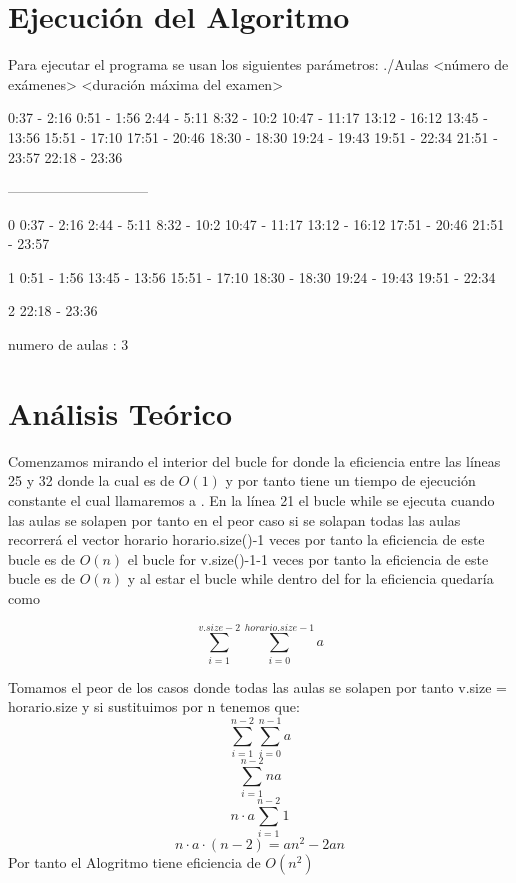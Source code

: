 \documentclass[11pt,openany]{book}
\begin{document}
\section{Ejecución del Algoritmo}
Para ejecutar el programa se usan los siguientes parámetros:
./Aulas <número de exámenes> <duración máxima del examen>

0:37 - 2:16 
0:51 - 1:56 
2:44 - 5:11 
8:32 - 10:2 
10:47 - 11:17 
13:12 - 16:12 
13:45 - 13:56 
15:51 - 17:10 
17:51 - 20:46 
18:30 - 18:30 
19:24 - 19:43 
19:51 - 22:34 
21:51 - 23:57 
22:18 - 23:36 

------------------------------

0
0:37 - 2:16               
2:44 - 5:11 
8:32 - 10:2 
10:47 - 11:17 
13:12 - 16:12 
17:51 - 20:46 
21:51 - 23:57 

1
0:51 - 1:56 
13:45 - 13:56 
15:51 - 17:10 
18:30 - 18:30 
19:24 - 19:43 
19:51 - 22:34 

2 
22:18 - 23:36 

numero de aulas : 3

\section{Análisis Teórico}
Comenzamos mirando el interior del bucle for donde la eficiencia entre 
las líneas 25 y 32 donde la cual es de $O(1)$ y por tanto tiene un tiempo 
de ejecución constante el cual llamaremos a . 
En la línea 21 el bucle while se ejecuta cuando las aulas se solapen 
por tanto en el peor caso si se solapan todas las aulas recorrerá el vector horario 
horario.size()-1 veces por tanto la eficiencia de este bucle es de $O(n)$ 
el bucle for v.size()-1-1 veces por tanto la eficiencia de este bucle es de $O(n)$
y al estar el bucle while dentro del for la eficiencia quedaría como 

\begin{equation*}
      \sum_{i=1}^{v.size -2} \sum_{i=0}^{horario.size -1}  a
\end{equation*}

Tomamos el peor de los casos donde todas las aulas se solapen 
por tanto v.size = horario.size y si sustituimos por n tenemos que:
\begin{equation*}
      \sum_{i=1}^{n -2} \sum_{i=0}^{n-1}  a
\end{equation*}
\begin{equation*}
      \sum_{i=1}^{n -2} na
\end{equation*}
\begin{equation*}
      n\cdot a \sum_{i=1}^{n -2} 1
\end{equation*}
\begin{equation*}
      n\cdot a \cdot (n-2) = an^2 -2an
\end{equation*}
Por tanto el Alogritmo tiene eficiencia de $O(n^2)$
\end{document}
